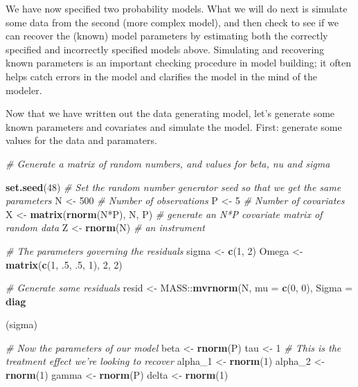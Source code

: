 \documentclass[]{book}
\newenvironment{Shaded}{\begin{snugshade}}{\end{snugshade}}
\newcommand{\KeywordTok}[1]{\textcolor[rgb]{0.13,0.29,0.53}{\textbf{{#1}}}}
\newcommand{\DataTypeTok}[1]{\textcolor[rgb]{0.13,0.29,0.53}{{#1}}}
\newcommand{\DecValTok}[1]{\textcolor[rgb]{0.00,0.00,0.81}{{#1}}}
\newcommand{\StringTok}[1]{\textcolor[rgb]{0.31,0.60,0.02}{{#1}}}
\newcommand{\CommentTok}[1]{\textcolor[rgb]{0.56,0.35,0.01}{\textit{{#1}}}}
\newcommand{\NormalTok}[1]{{#1}}
\begin{document}
We have now specified two probability models. What we will do next is
simulate some data from the second (more complex model), and then check
to see if we can recover the (known) model parameters by estimating both
the correctly specified and incorrectly specified models above.
Simulating and recovering known parameters is an important checking
procedure in model building; it often helps catch errors in the model
and clarifies the model in the mind of the modeler.

Now that we have written out the data generating model, let's generate
some known parameters and covariates and simulate the model. First:
generate some values for the data and paramaters.

\begin{Shaded}
\begin{Highlighting}[]
\CommentTok{# Generate a matrix of random numbers, and values for beta, nu and sigma}

\KeywordTok{set.seed}\NormalTok{(}\DecValTok{48}\NormalTok{) }\CommentTok{# Set the random number generator seed so that we get the same parameters}
\NormalTok{N <-}\StringTok{ }\DecValTok{500} \CommentTok{# Number of observations}
\NormalTok{P <-}\StringTok{ }\DecValTok{5} \CommentTok{# Number of covariates}
\NormalTok{X <-}\StringTok{ }\KeywordTok{matrix}\NormalTok{(}\KeywordTok{rnorm}\NormalTok{(N*P), N, P) }\CommentTok{# generate an N*P covariate matrix of random data}
\NormalTok{Z <-}\StringTok{ }\KeywordTok{rnorm}\NormalTok{(N) }\CommentTok{# an instrument}

\CommentTok{# The parameters governing the residuals}
\NormalTok{sigma <-}\StringTok{ }\KeywordTok{c}\NormalTok{(}\DecValTok{1}\NormalTok{, }\DecValTok{2}\NormalTok{)}
\NormalTok{Omega <-}\StringTok{ }\KeywordTok{matrix}\NormalTok{(}\KeywordTok{c}\NormalTok{(}\DecValTok{1}\NormalTok{, .}\DecValTok{5}\NormalTok{, .}\DecValTok{5}\NormalTok{, }\DecValTok{1}\NormalTok{), }\DecValTok{2}\NormalTok{, }\DecValTok{2}\NormalTok{)}

\CommentTok{# Generate some residuals}
\NormalTok{resid <-}\StringTok{ }\NormalTok{MASS::}\KeywordTok{mvrnorm}\NormalTok{(N, }\DataTypeTok{mu =} \KeywordTok{c}\NormalTok{(}\DecValTok{0}\NormalTok{, }\DecValTok{0}\NormalTok{), }\DataTypeTok{Sigma =} \KeywordTok{diag}\NormalTok{(sigma)%*%}\StringTok{ }\NormalTok{Omega %*%}\StringTok{ }\KeywordTok{diag}\NormalTok{(sigma))}

\CommentTok{# Now the parameters of our model}
\NormalTok{beta <-}\StringTok{ }\KeywordTok{rnorm}\NormalTok{(P)}
\NormalTok{tau <-}\StringTok{ }\DecValTok{1} \CommentTok{# This is the treatment effect we're looking to recover}
\NormalTok{alpha_1 <-}\StringTok{ }\KeywordTok{rnorm}\NormalTok{(}\DecValTok{1}\NormalTok{)}
\NormalTok{alpha_2 <-}\StringTok{ }\KeywordTok{rnorm}\NormalTok{(}\DecValTok{1}\NormalTok{)}
\NormalTok{gamma <-}\StringTok{ }\KeywordTok{rnorm}\NormalTok{(P)}
\NormalTok{delta <-}\StringTok{ }\KeywordTok{rnorm}\NormalTok{(}\DecValTok{1}\NormalTok{)}

}
\end{Highlighting}
\end{Shaded}
\end{document}
